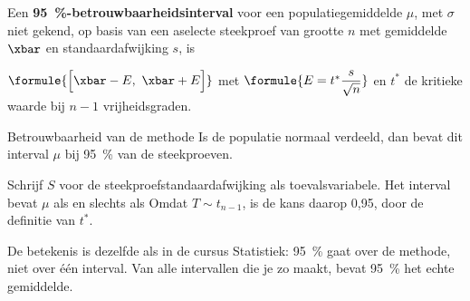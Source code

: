 \begin{theorie}
Een \textbf{\textcolor{accent}{95~\%-betrouwbaarheidsinterval}} voor een populatiegemiddelde $\mu$, met $\sigma$ niet gekend, op basis van een aselecte steekproef van grootte $n$ met gemiddelde $\xbar$ en standaardafwijking $s$, is

\vspace{1mm}
\qquad $\formule{\Bigl[\xbar - E,\ \xbar + E\Bigr]}$ \quad met \quad $\formule{E = t^* \dfrac{s}{\sqrt n}}$ \quad en $t^*$ de kritieke waarde bij $n - 1$ vrijheidsgraden.

\begin{stelling}{Betrouwbaarheid van de methode}
Is de populatie normaal verdeeld, dan bevat dit interval $\mu$ bij 95~\% van de steekproeven.
\end{stelling}

\begin{bewijs}
Schrijf $S$ voor de steekproefstandaardafwijking als toevalsvariabele. Het interval bevat $\mu$ als en slechts als
Omdat $T \sim t_{n-1}$, is de kans daarop 0,95, door de definitie van $t^*$.
\end{bewijs}
\end{theorie}

De betekenis is dezelfde als in de cursus Statistiek: 95~\% gaat over de methode, niet over één interval. Van alle intervallen die je zo maakt, bevat 95~\% het echte gemiddelde.


